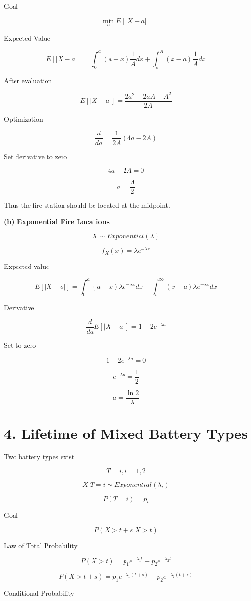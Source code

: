 \documentclass[12pt]{article}
\begin{document}
Goal

\[
\min_a E[|X-a|]
\]

Expected Value

\[
E[|X-a|]=
\int_0^a (a-x)\frac{1}{A}dx
+
\int_a^A (x-a)\frac{1}{A}dx
\]

After evaluation

\[
E[|X-a|]=\frac{2a^2-2aA+A^2}{2A}
\]

Optimization

\[
\frac{d}{da}=
\frac{1}{2A}(4a-2A)
\]

Set derivative to zero

\[
4a-2A=0
\]

\[
a=\frac{A}{2}
\]

Thus the fire station should be located at the midpoint.

\textbf{(b) Exponential Fire Locations}

\[
X\sim Exponential(\lambda)
\]

\[
f_X(x)=\lambda e^{-\lambda x}
\]

Expected value

\[
E[|X-a|]=
\int_0^a (a-x)\lambda e^{-\lambda x}dx
+
\int_a^\infty (x-a)\lambda e^{-\lambda x}dx
\]

Derivative

\[
\frac{d}{da}E[|X-a|]=1-2e^{-\lambda a}
\]

Set to zero

\[
1-2e^{-\lambda a}=0
\]

\[
e^{-\lambda a}=\frac{1}{2}
\]

\[
a=\frac{\ln 2}{\lambda}
\]

\section*{4. Lifetime of Mixed Battery Types}

Two battery types exist

\[
T=i, i=1,2
\]

\[
X|T=i \sim Exponential(\lambda_i)
\]

\[
P(T=i)=p_i
\]

Goal

\[
P(X>t+s|X>t)
\]

Law of Total Probability

\[
P(X>t)=p_1e^{-\lambda_1 t}+p_2e^{-\lambda_2 t}
\]

\[
P(X>t+s)=p_1e^{-\lambda_1(t+s)}+p_2e^{-\lambda_2(t+s)}
\]

Conditional Probability
\end{document}
